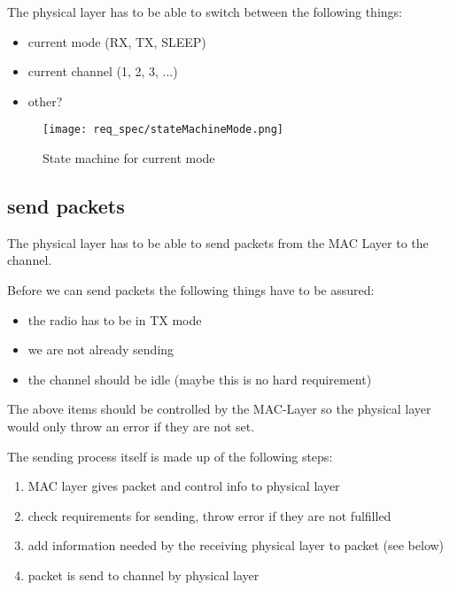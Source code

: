 The physical layer has to be able to switch between the following things:

\begin{itemize}
 \item current mode (RX, TX, SLEEP)
 \item current channel (1, 2, 3, ...)
 \item other?
\end{itemize}

\begin{figure}[t]
 \centering
 \texttt{[image: req\_spec/stateMachineMode.png]}
 \caption{State machine for current mode}
 \label{fig: mode state machine}
\end{figure}

\pagebreak
\subsection{send packets}

The physical layer has to be able to send packets from the MAC 
Layer to the channel.

Before we can send packets the following things have to be 
assured:
\linebreak
\begin{itemize}
 \item the radio has to be in TX mode
 \item we are not already sending
 \item the channel should be idle (maybe this is no hard requirement)
\end{itemize}

The above items should be controlled by the MAC-Layer so the physical layer 
would only throw an error if they are not set.

The sending process itself is made up of the following steps:

\begin{enumerate}
 \item MAC layer gives packet and control info to physical layer
 \item check requirements for sending, throw error if they are not fulfilled
 \item add information needed by the receiving physical layer to packet (see below)
 \item packet is send to channel by physical layer
\end{enumerate}

